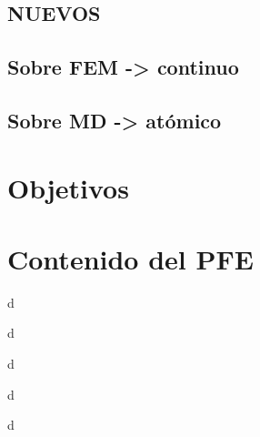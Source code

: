 \subsection{NUEVOS}
\label{S1_2_3}


\subsection{Sobre FEM -> continuo}
\label{S1_2_4}


\subsection{Sobre MD -> atómico}
\label{S1_2_5}


\section{Objetivos}
\label{S1_3}


\section{Contenido del PFE}
\label{S1_4}

d

d

d

d

d